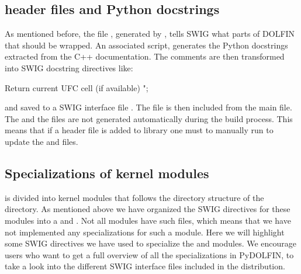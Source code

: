 \subsection{\dolfin header files and Python docstrings}
As mentioned before, the file , generated by  
, tells SWIG what parts of DOLFIN that should be wrapped. 
An associated script,  generates the Python
docstrings extracted from the C++ documentation.  
The comments are then transformed into SWIG docstring directives like:
\begin{c++}
Return current UFC cell (if available)
";
\end{c++}
and saved to a SWIG interface file . The
 file is then included from the main  file.
The  and the  files are not
generated automatically during the build process. This means that if a
header file is added to \dolfin library one must to manually run
 to update the  and  files.


\subsection{Specializations of kernel modules}
\dolfin is divided into kernel modules that follows the directory structure of the  directory. As mentioned above we have organized the SWIG directives for these modules into a  and . Not all modules have such files, which means that we have not implemented any specializations for such a module. Here we will highlight some SWIG directives we have used to specialize the  and  modules. We encourage users who want to get a full overview of all the specializations in PyDOLFIN, to take a look into the different SWIG interface files included in the distribution.

